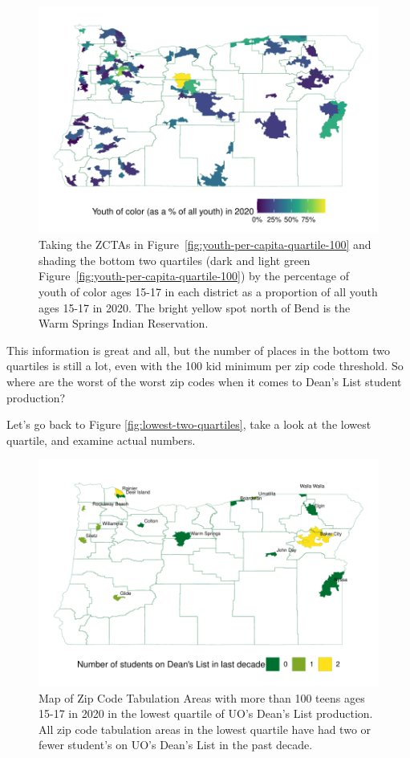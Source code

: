 \documentclass[10pt]{article}
\begin{document}
\begin{figure}[H]
	\centering
	\includegraphics[width=\linewidth]{../visualizations/youth-of-color}
	\caption{
		Taking the ZCTAs in Figure~\ref{fig:youth-per-capita-quartile-100} and shading the bottom two quartiles (dark and light green Figure~\ref{fig:youth-per-capita-quartile-100}) by the percentage of youth of color ages 15-17  in each district as a proportion of all youth ages 15-17 in 2020.
		The bright yellow spot north of Bend is the Warm Springs Indian Reservation.
	}
	\label{fig:youth-of-color}
\end{figure}

This information is great and all, but the number of places in the bottom two quartiles is still a lot, even with the 100 kid minimum per zip code threshold. So where are the worst of the worst zip codes when it comes to Dean's List student production? 

Let's go back to Figure \ref{fig:lowest-two-quartiles}, take a look at the lowest quartile, and examine actual numbers.

\begin{figure}[H]
	\centering
	\includegraphics[width=\linewidth]{../visualizations/few-kids-on-deans-list}
	\caption{
		Map of Zip Code Tabulation Areas with more than 100 teens ages 15-17 in 2020 in the lowest quartile of UO's Dean's List production. All zip code tabulation areas in the lowest quartile have had two or fewer student's on UO's Dean's List in the past decade.
	}
	\label{fig:few-kids-on-deans-list}
\end{figure}
\end{document}

